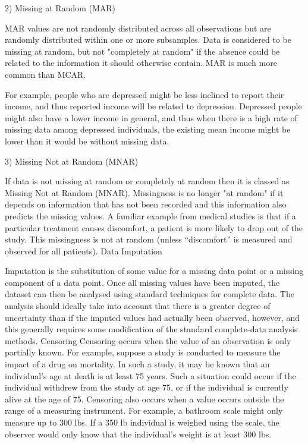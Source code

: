 2) Missing at Random (MAR)

MAR values are not randomly distributed across all observations but are randomly distributed within one or more subsamples. Data is considered to be missing at random, but not "completely at random" if the absence could be related to the information it should otherwise contain. MAR is much more common than MCAR.

For example, people who are depressed might be less inclined to report their income, and thus reported income will be related to depression. Depressed people might also have a lower income in general, and thus when there is a high rate of missing data among depressed individuals, the existing mean income might be lower than it would be without missing data. 

3) Missing Not at Random (MNAR)

If data is not missing at random or completely at random then it is classed as Missing Not at Random (MNAR). Missingness is no longer "at random" if it depends on information that has not been recorded and this information also predicts the missing values. 
A familiar example from medical studies is that if a particular treatment causes discomfort, a patient is more likely to drop out of the study. This missingness is not at random (unless “discomfort” is measured and observed for all patients).
Data Imputation

Imputation is the substitution of some value for a missing data point or a missing component of a data point. Once all missing values have been imputed, the dataset can then be analysed using standard techniques for complete data. The analysis should ideally take into account that there is a greater degree of uncertainty than if the imputed values had actually been observed, however, and this generally requires some modification of the standard complete-data analysis methods. 
Censoring
Censoring occurs when the value of an observation is only partially known. For example, suppose a study is conducted to measure the impact of a drug on mortality. In such a study, it may be known that an individual's age at death is at least 75 years. Such a situation could occur if the individual withdrew from the study at age 75, or if the individual is currently alive at the age of 75.
Censoring also occurs when a value occurs outside the range of a measuring instrument. For example, a bathroom scale might only measure up to 300 lbs. If a 350 lb individual is weighed using the scale, the observer would only know that the individual's weight is at least 300 lbs.


